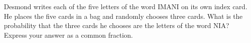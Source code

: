 Desmond writes each of the five letters of the word IMANI on its own index card. He places the five cards in a bag and randomly chooses three cards. What is the probability that the three cards he chooses are the letters of the word NIA? Express your answer as a common fraction.
